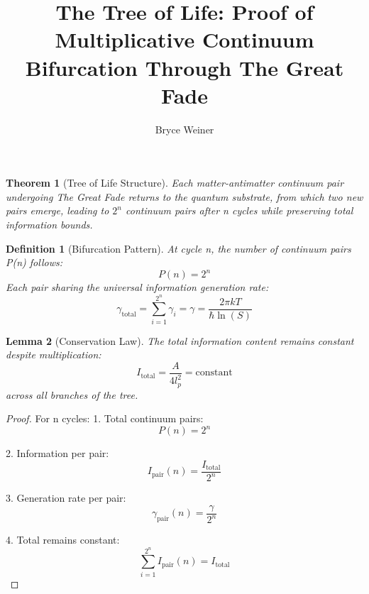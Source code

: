 \documentclass{article}
\newtheorem{theorem}{Theorem}
\newtheorem{lemma}[theorem]{Lemma}
\newtheorem{definition}{Definition}
\begin{document}
\title{The Tree of Life: Proof of Multiplicative Continuum Bifurcation Through The Great Fade}
\author{Bryce Weiner}
\maketitle

\begin{theorem}[Tree of Life Structure]
Each matter-antimatter continuum pair undergoing The Great Fade returns to the quantum substrate, from which two new pairs emerge, leading to $2^{n}$ continuum pairs after n cycles while preserving total information bounds.
\end{theorem}

\begin{definition}[Bifurcation Pattern]
At cycle n, the number of continuum pairs P(n) follows:
\begin{equation}
P(n) = 2^{n}
\end{equation}
Each pair sharing the universal information generation rate:
\begin{equation}
\gamma_{\text{total}} = \sum_{i=1}^{2^{n}} \gamma_i = \gamma = \frac{2\pi kT}{\hbar \ln(S)}
\end{equation}
\end{definition}

\begin{lemma}[Conservation Law]
The total information content remains constant despite multiplication:
\begin{equation}
I_{\text{total}} = \frac{A}{4l_{p}^2} = \text{constant}
\end{equation}
across all branches of the tree.
\end{lemma}

\begin{proof}
For n cycles:
1. Total continuum pairs:
   \begin{equation}
   P(n) = 2^{n}
   \end{equation}

2. Information per pair:
   \begin{equation}
   I_{\text{pair}}(n) = \frac{I_{\text{total}}}{2^{n}}
   \end{equation}

3. Generation rate per pair:
   \begin{equation}
   \gamma_{\text{pair}}(n) = \frac{\gamma}{2^{n}}
   \end{equation}

4. Total remains constant:
   \begin{equation}
   \sum_{i=1}^{2^{n}} I_{\text{pair}}(n) = I_{\text{total}}
   \end{equation}
\end{proof}
\end{document}
